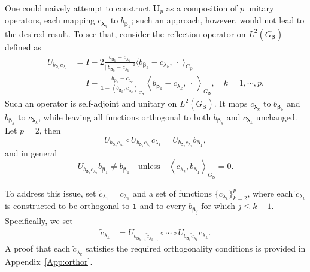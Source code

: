 \documentclass[11pt]{article}
\newcommand{\vect}[1]{\boldsymbol{#1}}
\newcommand{\inner}[1]{\left\langle #1 \right\rangle}
\begin{document}
One could naively attempt to construct $\vect{U}_p$ as a composition of $p$ unitary operators, each mapping $c_{\vect{\lambda}_k}$ to $b_{\vect{\beta}_k}$; such an approach, however, would not lead to the desired result. To see that, consider the reflection operator on $ L^2(G_{\vect{\beta}})$ defined as 
\begin{equation*}
\begin{aligned}
U_{b_{\vect{\beta}_k} c_{\lambda_k}} &=
I- 2\frac{b_{\vect{\beta}_k}-c_{\lambda_k}}{||b_{\vect{\beta}_k}-c_{\lambda_k}||^2}\langle b_{\vect{\beta}_k}-c_{\lambda_k}, \ \cdot \ \rangle_{G_{\vect{\beta}}} \\ 
&= I -\frac{
b_{\vect{\beta}_k}-c_{\lambda_k}}{\vect{1}-\left\langle b_{\vect{\beta}_k}, c_{\lambda_k}\right\rangle_{G_{\boldsymbol{\beta}}}}\left\langle b_{\vect{\beta}_k}-c_{\lambda_k}, \ \cdot \ \right\rangle_{G_{\boldsymbol{\beta}}},  \quad k=1,\cdots,p. 
\end{aligned}
\end{equation*} 
Such an operator is self-adjoint and unitary on $L^2(G_{\vect{\beta}})$. It maps $c_{\vect{\lambda}_k}$ to $b_{\vect{\beta}_k}$ and $b_{\vect{\beta}_k}$ to $c_{\vect{\lambda}_k}$, while leaving all functions orthogonal to both $b_{\vect{\beta}_k}$ and $c_{\vect{\lambda}_k}$ unchanged. Let $p=2$, then
$$ U_{b_{\vect{\beta}_2} c_{\lambda_2}}\circ U_{b_{\vect{\beta}_1} c_{\lambda_1}}c_{\lambda_{1}}=U_{b_{\vect{\beta}_2} c_{\lambda_2}} b_{\vect{\beta}_1},$$
and in general 
$$ U_{b_{\vect{\beta}_2} c_{\lambda_2}} b_{\vect{\beta}_1}  \neq b_{\vect{\beta}_1} \quad  \text{unless} \quad\inner{c_{\lambda_2},  b_{\vect{\beta}_1}}_{G_{\vect{\beta}}}=0.$$ 

To address this issue, set $\widetilde{c}_{\lambda_1}=c_{\lambda_1}$ and a set of functions $\{\widetilde{c}_{{\lambda}_k}\}_{k=2}^p$, where each $\widetilde{c}_{{\lambda}_k}$ is constructed to be orthogonal to $\vect{1}$ and to every $b_{\vect{\beta}_j}$ for which $j\leq k-1$. Specifically, we set 
\begin{equation}
    \begin{aligned}
\widetilde{c}_{\lambda_{k}}&=U_{b_{\vect{\beta}_{k-1}}\widetilde{c}_{\lambda_{k-1}}} \circ \cdots  \circ U_{b_{\vect{\beta}_1} \widetilde{c}_{\lambda_1}} c_{\lambda_{k}}.
\label{eqn:tildec}
\end{aligned}
\end{equation}
A proof that each $\widetilde{c}_{\lambda_{k}}$ satisfies the required orthogonality conditions is provided in Appendix~\ref{App:orthor}. 
\end{document}
